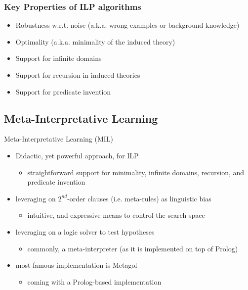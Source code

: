 \documentclass[presentation]{beamer}\mode<presentation>{\usetheme{AMSBolognaFC}}
\begin{document}
\begin{frame}%
\frametitle{Key Properties of ILP algorithms}

    \begin{itemize}
        \item \alert{Robustness} w.r.t. noise (a.k.a. wrong examples or background knowledge)
        \item \alert{Optimality} (a.k.a. minimality of the induced theory)
        \item Support for \alert{infinite domains}
        \item Support for \alert{recursion} in induced theories
        \item Support for \alert{predicate invention}
    \end{itemize}
\end{frame}

\subsection{Meta-Interpretative Learning}

\begin{frame}{Meta-Interpretative Learning (MIL)}
    \begin{itemize}
        \item Didactic, yet powerful approach, for ILP
        \begin{itemize}
            \item straightforward support for minimality, infinite domains, recursion, and predicate invention
        \end{itemize}
        
        \vfill

        \item leveraging on $2^{nd}$-order clauses (i.e. \alert{meta-rules}) as linguistic bias
        \begin{itemize}
            \item intuitive, and expressive means to control the search space
        \end{itemize}
        
        \vfill

        \item leveraging on a \alert{logic solver} to test hypotheses
        \begin{itemize}
            \item commonly, a meta-interpreter (as it is implemented on top of Prolog)
        \end{itemize}

        \vfill

        \item most famous implementation is Metagol
        \begin{itemize}
            \item coming with a Prolog-based implementation
        \end{itemize}
    \end{itemize}
\end{frame}
\end{document}
